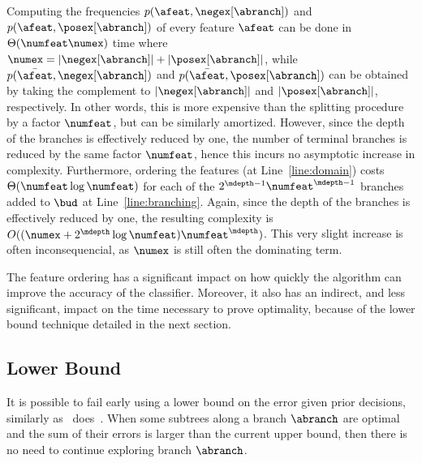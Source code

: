 \documentclass{article}
\begin{document}


Computing the frequencies $p(\afeat,{\negex[\abranch]})$ and $p(\afeat,{\posex[\abranch]})$ of every feature $\afeat$ can be done in  $\Theta(\numfeat\numex)$ time where 
$\numex = |\negex[\abranch]|+|\posex[\abranch]|$, while $p(\bar{\afeat},{\negex[\abranch]})$ and $p(\bar{\afeat},{\posex[\abranch]})$ can be obtained by taking the complement to $|\negex[\abranch]|$ and $|\posex[\abranch]|$, respectively.
In other words, this is more expensive than the splitting procedure by a factor $\numfeat$, but can be similarly amortized. However, since the depth of the branches is effectively reduced by one, the number of terminal branches is reduced by the same factor $\numfeat$, hence this incurs no asymptotic increase in complexity.
Furthermore, ordering the features (at Line~\ref{line:domain})
costs $\Theta(\numfeat \log \numfeat)$ for each of the $2^{\mdepth-1}\numfeat^{\mdepth-1}$ branches added to $\bud$ at Line~\ref{line:branching}. Again, since the depth of the branches is effectively reduced by one, the resulting complexity 
is $O((\numex + 2^{\mdepth} \log \numfeat) \numfeat^{\mdepth})$. This very slight increase is often inconsequencial, as 
$\numex$ is still often the dominating term.

The feature ordering has a  significant impact on how quickly the algorithm can improve the accuracy of the classifier. Moreover, it also has an indirect, and  less significant, impact on the time necessary to prove optimality, because of the lower bound technique detailed in the next section.


\subsection{Lower Bound}
\label{sec:lb}

It is possible to fail early using a lower bound on the error given prior decisions, similarly as \dleight\ does~\cite{dl8}.
When some subtrees along a branch $\abranch$ are optimal and the sum of their errors is larger than the current upper bound, 
then there is no need to continue exploring branch $\abranch$. 
\end{document}
